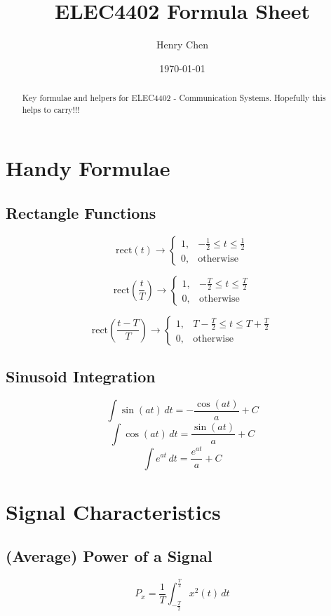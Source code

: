 \documentclass[10pt]{article}
\title{ELEC4402 Formula Sheet}
\author{Henry Chen}
\date{\today}
\begin{document}
\maketitle

\begin{abstract}
    Key formulae and helpers for ELEC4402 - Communication Systems. Hopefully this helps to carry!!!
\end{abstract}

\tableofcontents
\newpage

\section{Handy Formulae}
\subsection{Rectangle Functions}
\[
	\text{rect}(t) \rightarrow
	\begin{cases}
		1, & -\frac{1}{2} \leq t \leq \frac{1}{2} \\
		0, & \text{otherwise}
	\end{cases}
\]

\[
	\text{rect}\left(\frac{t}{T}\right) \rightarrow
	\begin{cases}
		1, & -\frac{T}{2} \leq t \leq \frac{T}{2} \\
		0, & \text{otherwise}
	\end{cases}
\]

\[
	\text{rect}\left(\frac{t - T}{T}\right) \rightarrow
	\begin{cases}
		1, & T - \frac{T}{2} \leq t \leq T + \frac{T}{2} \\
		0, & \text{otherwise}
	\end{cases}
\]

\subsection{Sinusoid Integration}
\[
	\int \sin(at) \, dt = -\frac{\cos(at)}{a} + C
\]
\[
	\int \cos(at) \, dt = \frac{\sin(at)}{a} + C
\]
\[
	\int e^{at} \, dt = \frac{e^{at}}{a} + C
\]

\section{Signal Characteristics}
\subsection{(Average) Power of a Signal}
$$
	P_x = \frac{1}{T} \int_{-\frac{T}{2}}^{\frac{T}{2}} x^2(t) \, dt
$$
\end{document}
